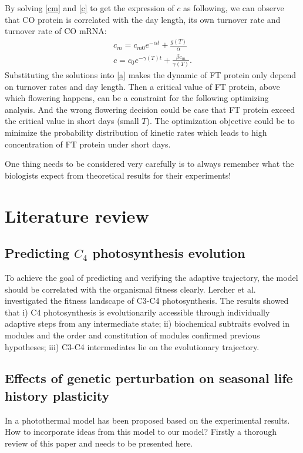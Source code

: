 \documentclass[paper=a4, fontsize=12pt]{scrartcl}	%
\numberwithin{equation}{section}					%
\numberwithin{figure}{section}					%
\numberwithin{table}{section}					%
\begin{document}
By solving \eqref{cm} and \eqref{c} to get the expression of $c$ as following, we can observe that CO protein is correlated with the day length, its own turnover rate and turnover rate of CO mRNA:
\begin{align}
\nonumber c_m=c_{m0}e^{-\alpha t}+\frac{g(T)}{\alpha}\\
\nonumber c=c_{0}e^{-\gamma (T) t}+\frac{\beta c_m}{\gamma(T)}. 
\end{align}
Substituting the solutions into \eqref{a} makes the dynamic of FT protein only depend on turnover rates and day length. Then a critical value of FT protein, above which flowering happens, can be a constraint for the following optimizing analysis.  And the wrong flowering decision could be case that FT protein exceed the critical value in short days (small $T$). The optimization objective could be to minimize the probability distribution of kinetic rates which leads to high concentration of FT protein under short days. 




One thing needs to be considered very carefully is to always remember what the biologists expect from theoretical results for their experiments!

\section{Literature review}
\subsection{Predicting $C_4$ photosynthesis evolution}
To achieve the goal of predicting and verifying the adaptive trajectory, the model should be correlated with the organismal fitness clearly. Lercher et al. investigated the fitness landscape of C3-C4 photosynthesis. The results showed that i) C4 photosynthesis is evolutionarily accessible through individually adaptive steps from any intermediate state; ii) biochemical subtraits evolved in modules and the order and constitution of modules confirmed previous hypotheses; iii) C3-C4 intermediates lie on the evolutionary trajectory. 


\subsection{Effects of genetic perturbation on seasonal life history plasticity}
In \cite{wilczek2009} a photothermal model  has been proposed based on the experimental results. How to incorporate ideas from this model to our model? Firstly a thorough review of this paper and \cite{chew2012} needs to be presented here. 
\end{document}
